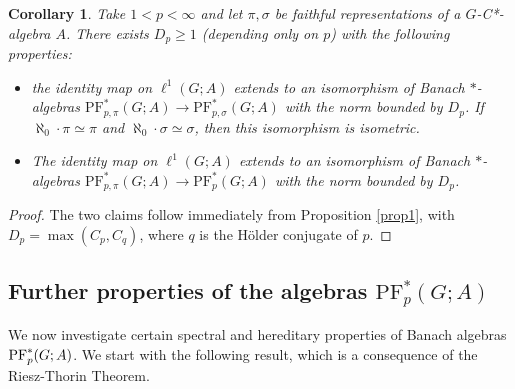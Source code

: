 \documentclass[12pt]{amsart}
\newtheorem{cor}[thm]{Corollary}
\theoremstyle{definition}
\theoremstyle{remark}
\numberwithin{equation}{section}
\newcommand{\PF}[3]{\ensuremath{\mathrm{PF}_{#1}^*\left(#2; #3\right)}}
\begin{document}
\begin{cor}\label{cor:indepBanach}
Take $1<p<\infty$ and let $\pi,\sigma$ be faithful representations of a $G$-C*-algebra $A$. There exists $D_p\ge 1$ (depending only on $p$) with the following properties:
 \begin{itemize}
 \item[(i)] the identity map on $\ell^1(G;A)$ extends to an isomorphism of Banach $*$-algebras $\PF{p,\pi}{G}{A} \rightarrow \PF{p,\sigma}{G}{A}$ with the norm bounded by $D_p$. If $\aleph_0\cdot \pi\simeq \pi$ and $\aleph_0\cdot\sigma\simeq \sigma$, then this isomorphism is isometric.
 \item[(ii)] The identity map on $\ell^1(G;A)$ extends to an isomorphism of Banach $*$-algebras $\PF{p,\pi}{G}{A}\rightarrow \PF{p}{G}{A}$ with the norm bounded by $D_p$.
\end{itemize}
\end{cor}


\begin{proof}
The two claims follow immediately from Proposition \ref{prop1}, with $D_p=\max(C_p,C_q)$, where $q$ is the H{\"o}lder conjugate of $p$. 
\end{proof}


\subsection{Further properties of the algebras $\PF{p}{G}{A}$}



We now investigate certain spectral and hereditary properties of Banach algebras $\textup{PF}^*_p(G;A)$. We start with the following result, which is a consequence of the Riesz-Thorin Theorem.
\end{document}
